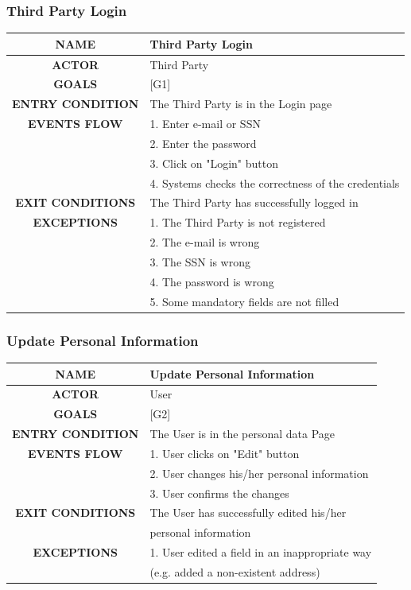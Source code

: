 \documentclass[12pt,a4paper]{article}
\begin{document}
		\subsubsection{Third Party Login}
		\begin{center}
			\begin{tabular}{| c | l |}
				\hline
				\textbf{NAME} & Third Party Login \\
				\hline
				\textbf{ACTOR} & Third Party \\
				\hline
				\textbf{GOALS} & [G1] \\
				\hline
				\textbf{ENTRY CONDITION} & The Third Party is in the Login page \\ \hline
				\textbf{EVENTS FLOW}  &
				1. Enter e-mail or SSN\\
				&2. Enter the password\\
				&3. Click on "Login" button\\
				&4. Systems checks the correctness of the credentials\\
				\hline
				\textbf{EXIT CONDITIONS}  & The Third Party has successfully logged in \\ \hline
				\textbf{EXCEPTIONS} &
				1. The Third Party is not registered\\
				&2. The e-mail is wrong\\
				&3. The SSN is wrong\\
				&4. The password is wrong\\
				&5. Some mandatory fields are not filled\\
				\hline
			\end{tabular}
		\end{center}

		\subsubsection{Update Personal Information}
		\begin{center}
			\begin{tabular}{| c | l |}
				\hline
				\textbf{NAME} & Update Personal Information \\
				\hline
				\textbf{ACTOR} & User \\
				\hline
				\textbf{GOALS} & [G2] \\
				\hline
				\textbf{ENTRY CONDITION} & The User is in the personal data Page \\ \hline
				\textbf{EVENTS FLOW}  &
				1. User clicks on "Edit" button\\
				&2. User changes his/her personal information \\
				&3. User confirms the changes\\
				\hline
				\textbf{EXIT CONDITIONS}
				& The User has successfully edited his/her \\
				& personal information \\ \hline
				\textbf{EXCEPTIONS} &
				1. User edited a field in an inappropriate way \\
				& (e.g. added a non-existent address)\\
				\hline
			\end{tabular}
		\end{center}
\end{document}
